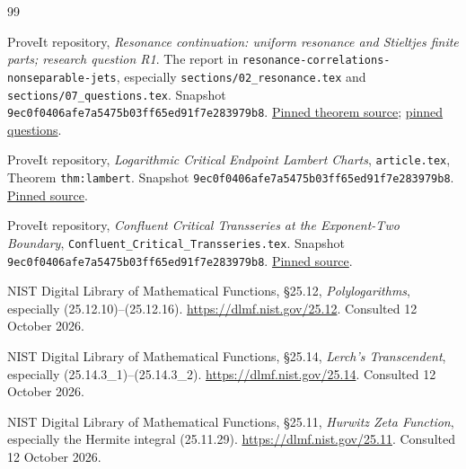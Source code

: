 \documentclass[11pt,a4paper]{article}
\numberwithin{equation}{section}
\theoremstyle{definition}
\theoremstyle{remark}
\newcommand{\snapshot}{\texttt{9ec0f0406afe7a5475b03ff65ed91f7e283979b8}}
\begin{document}
\begin{thebibliography}{99}
\small\raggedright
\setlength{\itemsep}{5pt}

ProveIt repository,
\emph{Resonance continuation: uniform resonance and Stieltjes finite
parts; research question R1}.
The report in
\texttt{resonance-correlations-nonseparable-jets}, especially
\texttt{sections/02\_resonance.tex} and
\texttt{sections/07\_questions.tex}.
Snapshot \snapshot.
\href{https://github.com/VladimirReshetnikov/ProveIt/blob/9ec0f0406afe7a5475b03ff65ed91f7e283979b8/Analysis/Polylogarithms/docs/reports/uniform-transition-continuation/continuations/resonance-correlations-nonseparable-jets/sections/02_resonance.tex}{Pinned theorem source};
\href{https://github.com/VladimirReshetnikov/ProveIt/blob/9ec0f0406afe7a5475b03ff65ed91f7e283979b8/Analysis/Polylogarithms/docs/reports/uniform-transition-continuation/continuations/resonance-correlations-nonseparable-jets/sections/07_questions.tex}{pinned questions}.

ProveIt repository,
\emph{Logarithmic Critical Endpoint Lambert Charts},
\texttt{article.tex}, Theorem \texttt{thm:lambert}.
Snapshot \snapshot.
\href{https://github.com/VladimirReshetnikov/ProveIt/blob/9ec0f0406afe7a5475b03ff65ed91f7e283979b8/Analysis/Transseries/docs/series-and-transseries/Logarithmic_Critical_Endpoint_Lambert_Charts/article.tex}{Pinned source}.

ProveIt repository,
\emph{Confluent Critical Transseries at the Exponent-Two Boundary},
\texttt{Confluent\_Critical\_Transseries.tex}.
Snapshot \snapshot.
\href{https://github.com/VladimirReshetnikov/ProveIt/blob/9ec0f0406afe7a5475b03ff65ed91f7e283979b8/Analysis/Transseries/docs/series-and-transseries/Confluent_Critical_Transseries_Exponent_Two_Boundary/Confluent_Critical_Transseries.tex}{Pinned source}.

NIST Digital Library of Mathematical Functions,
\S25.12, \emph{Polylogarithms}, especially
(25.12.10)--(25.12.16).
\url{https://dlmf.nist.gov/25.12}.
Consulted 12 October 2026.

NIST Digital Library of Mathematical Functions,
\S25.14, \emph{Lerch's Transcendent}, especially
(25.14.3\_1)--(25.14.3\_2).
\url{https://dlmf.nist.gov/25.14}.
Consulted 12 October 2026.

NIST Digital Library of Mathematical Functions,
\S25.11, \emph{Hurwitz Zeta Function}, especially
the Hermite integral (25.11.29).
\url{https://dlmf.nist.gov/25.11}.
Consulted 12 October 2026.


\end{thebibliography}
\end{document}
